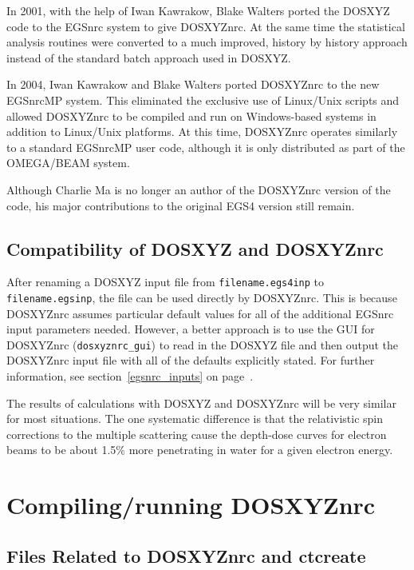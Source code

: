 \documentclass[12pt,twoside]{article}      %
\newcommand{\indexm}[1]{\index{#1}}
\begin{document}
In 2001, with the help of Iwan Kawrakow, Blake Walters ported the
DOSXYZ code to the EGSnrc system to give DOSXYZnrc. At the same time
the statistical analysis routines were converted to a much improved,
history by history approach\cite{Wa02a} instead of the standard batch
approach used in DOSXYZ.

In 2004, Iwan Kawrakow and Blake Walters ported DOSXYZnrc to the new
EGSnrcMP system\cite{Ka03}.  This eliminated the exclusive use of Linux/Unix scripts
and allowed DOSXYZnrc to be compiled and run on Windows-based systems in
addition to Linux/Unix platforms.  At this time, DOSXYZnrc operates
similarly to a standard EGSnrcMP user code, although it is only distributed
as part of the OMEGA/BEAM system.

Although Charlie Ma is no longer an author of the DOSXYZnrc version of the
code, his major contributions to the original EGS4 version still remain.

\vfill

\subsection{Compatibility of DOSXYZ and DOSXYZnrc}

After renaming a DOSXYZ input file from {\tt filename.egs4inp} to {\tt
filename.egsinp}, the file can be used directly by DOSXYZnrc.  This is
because DOSXYZnrc assumes particular default values for all of the
additional EGSnrc input parameters needed.  However, a better approach is
to use the GUI for DOSXYZnrc ({\tt dosxyznrc\_gui}) to read in the DOSXYZ file
and then output the DOSXYZnrc input file with all of the defaults
explicitly stated.  For further information, see
section~\ref{egsnrc_inputs} on page~\pageref{egsnrc_inputs}.

The results of calculations with DOSXYZ and DOSXYZnrc will be very similar
for most situations.  The one systematic difference is that the
relativistic spin corrections to the multiple scattering cause the
depth-dose curves for electron beams to be about 1.5\% more penetrating in
water for a given
electron energy\cite{Wa00}.
\vfill
\newpage


\section{Compiling/running DOSXYZnrc}
\indexm{compiling!DOSXYZnrc}

\subsection{Files Related to DOSXYZnrc and ctcreate}
\label{filesect}
\end{document}
